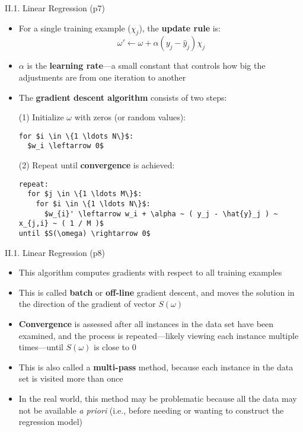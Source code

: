 \documentclass[handout]{beamer}
\newcommand{\strong}[1]{\textbf{\color{teal} #1}}
\newcommand{\stronger}[1]{\textbf{\color{purple} #1}}
\begin{document}
\begin{frame}[fragile]{II.1. Linear Regression (p7)}
\begin{itemize}
\item For a single training example ($\chi_j$), the \stronger{update rule} is:
\[
	\omega' \leftarrow \omega + \alpha ( y_j - \hat{y}_j ) \chi_j
\]
\item $\alpha$ is the \strong{learning rate}---a small constant that controls how big the adjustments are from one iteration to another
\item The \stronger{gradient descent algorithm} consists of two steps:
\item[(1)] Initialize $\omega$ with zeros (or random values):
\begin{lstlisting}
for $i \in \{1 \ldots N\}$:
  $w_i \leftarrow 0$
\end{lstlisting}
\item[(2)] Repeat until \strong{convergence} is achieved:
\begin{lstlisting}
repeat:
  for $j \in \{1 \ldots M\}$:
    for $i \in \{1 \ldots N\}$:
      $w_{i}' \leftarrow w_i + \alpha ~ ( y_j - \hat{y}_j ) ~ x_{j,i} ~ ( 1 / M )$
until $S(\omega) \rightarrow 0$
\end{lstlisting}
\end{itemize}
\end{frame}
\begin{frame}[fragile]{II.1. Linear Regression (p8)}
\begin{itemize}
\item This algorithm computes gradients with respect to all training examples
\item This is called \strong{batch} or \strong{off-line} gradient descent, and moves the solution in the direction of the gradient of vector $S(\omega)$
\item \strong{Convergence} is assessed after all instances in the data set have been examined, and the process is repeated---likely viewing each instance multiple times---until $S(\omega)$ is close to $0$
\item This is also called a \strong{multi-pass} method, because each instance in the data set is visited more than once
\item In the real world, this method may be problematic because all the data may not be available \emph{a priori} (i.e., before needing or wanting to construct the regression model)
\end{itemize}
\end{frame}
\end{document}
